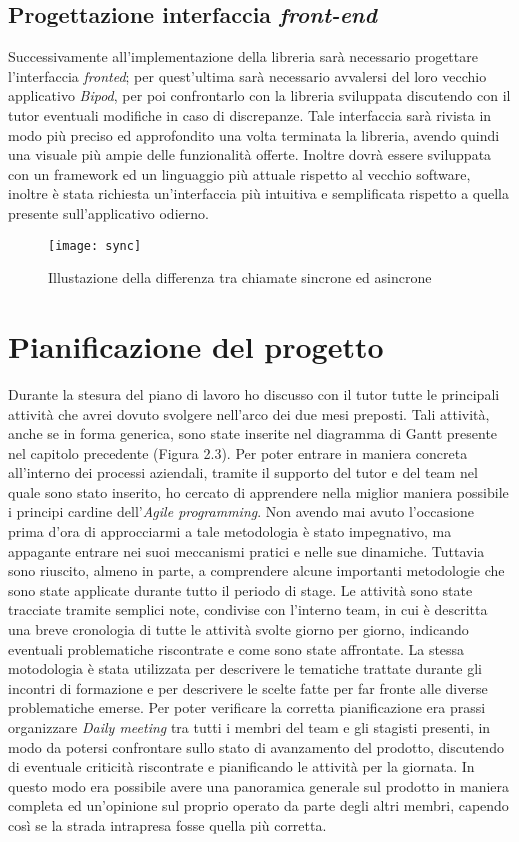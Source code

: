 \subsection{Progettazione interfaccia \textit{front-end}}
Successivamente all'implementazione della libreria sarà necessario progettare l'interfaccia \textit{fronted}; per quest'ultima sarà necessario avvalersi del loro vecchio applicativo \textit{Bipod}, per poi confrontarlo con la libreria sviluppata discutendo con il tutor eventuali modifiche in caso di discrepanze. Tale interfaccia sarà rivista in modo più preciso ed approfondito una volta terminata la libreria, avendo quindi una visuale più ampie delle funzionalità offerte. Inoltre dovrà essere sviluppata con un framework ed un linguaggio più attuale rispetto al vecchio software, inoltre è stata richiesta un'interfaccia più intuitiva e semplificata rispetto a quella presente sull'applicativo odierno.
\begin{figure}[!h] 
	\centering 
	\texttt{[image: sync]} 
	\caption{Illustazione della differenza tra chiamate sincrone ed asincrone}
\end{figure}
\newpage
\section{Pianificazione del progetto}
Durante la stesura del piano di lavoro ho discusso con il tutor tutte le principali attività che avrei dovuto svolgere nell'arco dei due mesi preposti. Tali attività, anche se in forma generica, sono state inserite nel diagramma di Gantt presente nel capitolo precedente (Figura 2.3).
Per poter entrare in maniera concreta all'interno dei processi aziendali, tramite il supporto del tutor e del team nel quale sono stato inserito, ho cercato di apprendere nella miglior maniera possibile i principi cardine dell'\textit{Agile programming}. Non avendo mai avuto l'occasione prima d'ora di approcciarmi a tale metodologia è stato impegnativo, ma appagante entrare nei suoi meccanismi pratici e nelle sue dinamiche. Tuttavia sono riuscito, almeno in parte, a comprendere alcune importanti metodologie che sono state applicate durante tutto il periodo di stage. Le attività sono state tracciate tramite semplici note, condivise con l'interno team, in cui è descritta una breve cronologia di tutte le attività svolte giorno per giorno, indicando eventuali problematiche riscontrate e come sono state affrontate. La stessa motodologia è stata utilizzata per descrivere le tematiche trattate durante gli incontri di formazione e per descrivere le scelte fatte per far fronte alle diverse problematiche emerse.
Per poter verificare la corretta pianificazione era prassi organizzare \textit{Daily meeting} tra tutti i membri del team e gli stagisti presenti, in modo da potersi confrontare sullo stato di avanzamento del prodotto, discutendo di eventuale criticità riscontrate e pianificando le attività per la giornata. In questo modo era possibile avere una panoramica generale sul prodotto in maniera completa ed un'opinione sul proprio operato da parte degli altri membri, capendo così se la strada intrapresa fosse quella più corretta.


